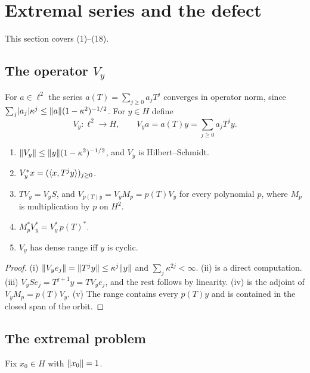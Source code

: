 \section{Extremal series and the defect}\label{sec:extremal}

This section covers \paper{} (1)--(18).

\subsection{\texorpdfstring{The operator $V_y$}{The series operator}}
For $a\in\ell^2$ the series $a(T)=\sum_{j\ge0}a_jT^j$ converges in operator norm, since
$\sum_j\lvert a_j\rvert\kappa^j\le\lVert a\rVert(1-\kappa^2)^{-1/2}$. For $y\in H$ define
\[
V_y:\ell^2\to H,\qquad V_ya=a(T)y=\sum_{j\ge0}a_jT^jy .
\]
\begin{lemma}\label{lem:V}\stproved{}
\begin{enumerate}[label=(\roman*)]
\item $\lVert V_y\rVert\le\lVert y\rVert(1-\kappa^2)^{-1/2}$, and $V_y$ is Hilbert--Schmidt.
\item $V_y^*x=(\langle x,T^jy\rangle)_{j\ge0}$.
\item $TV_y=V_yS$, and $V_{p(T)y}=V_yM_p=p(T)V_y$ for every polynomial $p$, where $M_p$ is
multiplication by $p$ on $H^2$.
\item $M_p^*V_y^*=V_y^*\,p(T)^*$.
\item $V_y$ has dense range iff $y$ is cyclic.
\end{enumerate}
\end{lemma}
\begin{proof}
(i) $\lVert V_ye_j\rVert=\lVert T^jy\rVert\le\kappa^j\lVert y\rVert$ and $\sum_j\kappa^{2j}<\infty$. (ii) is a
direct computation. (iii) $V_ySe_j=T^{j+1}y=TV_ye_j$, and the rest follows by linearity. (iv) is
the adjoint of $V_yM_p=p(T)V_y$. (v) The range contains every $p(T)y$ and is contained in the
closed span of the orbit.
\end{proof}

\subsection{The extremal problem}
Fix $x_0\in H$ with $\lVert x_0\rVert=1$.


